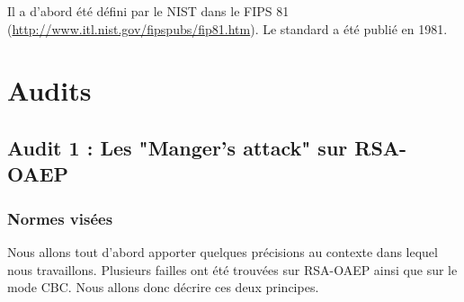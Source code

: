 Il a d'abord été défini par le NIST dans le FIPS 81 (\url{http://www.itl.nist.gov/fipspubs/fip81.htm}). Le standard a été publié en 1981.


\section{Audits}
	\subsection{Audit 1 : Les "Manger's attack" sur RSA-OAEP}
		\subsubsection{Normes visées}

Nous allons tout d'abord apporter quelques précisions au contexte dans lequel nous travaillons. Plusieurs failles ont été trouvées sur RSA-OAEP ainsi que sur le mode CBC. Nous allons donc décrire ces deux principes.
